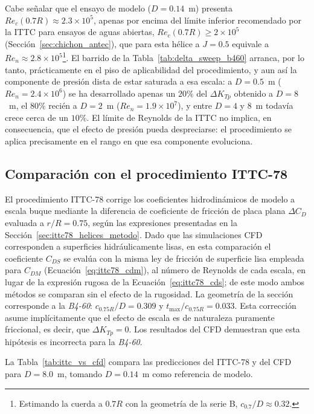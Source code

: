 Cabe señalar que el ensayo de modelo ($D=0.14$~m) presenta $Re_c(0.7R)\approx2.3\times10^5$, apenas por encima del límite inferior recomendado por la ITTC para ensayos de aguas abiertas, $Re_c(0.7R)\geq2\times10^5$ (Sección~\ref{sec:chichon_antec}), que para esta hélice a $J=0.5$ equivale a $Re_n\approx2.8\times10^5$\footnote{Estimando la cuerda a $0.7R$ con la geometría de la serie B, $c_{0.7}/D\approx0.32$.}. El barrido de la Tabla~\ref{tab:delta_sweep_b460} arranca, por lo tanto, prácticamente en el piso de aplicabilidad del procedimiento, y aun así la componente de presión dista de estar saturada a esa escala: a $D=0.5$~m ($Re_n=2.4\times10^6$) se ha desarrollado apenas un $20\%$ del $\Delta K_{Tp}$ obtenido a $D=8$~m, el $80\%$ recién a $D=2$~m ($Re_n=1.9\times10^7$), y entre $D=4$ y $8$~m todavía crece cerca de un $10\%$. El límite de Reynolds de la ITTC no implica, en consecuencia, que el efecto de presión pueda despreciarse: el procedimiento se aplica precisamente en el rango en que esa componente evoluciona.

\subsection{Comparación con el procedimiento ITTC-78}
\label{sec:helices_ittc78}

El procedimiento ITTC-78 corrige los coeficientes hidrodinámicos de modelo a escala buque mediante la diferencia de coeficiente de fricción de placa plana $\Delta C_D$ evaluada a $r/R = 0.75$, según las expresiones presentadas en la Sección~\ref{sec:ittc78_helices_metodo}. Dado que las simulaciones CFD corresponden a superficies hidráulicamente lisas, en esta comparación el coeficiente $C_{DS}$ se evalúa con la misma ley de fricción de superficie lisa empleada para $C_{DM}$ (Ecuación~\ref{eq:ittc78_cdm}), al número de Reynolds de cada escala, en lugar de la expresión rugosa de la Ecuación~\ref{eq:ittc78_cds}; de este modo ambos métodos se comparan sin el efecto de la rugosidad. La geometría de la sección corresponde a la \textit{B4-60}: $c_{0.75R}/D=0.309$ y $t_{\max}/c_{0.75R}=0.033$. Esta corrección asume implícitamente que el efecto de escala es de naturaleza puramente friccional, es decir, que $\Delta K_{Tp} = 0$. Los resultados del CFD demuestran que esta hipótesis es incorrecta para la \textit{B4-60}.

La Tabla~\ref{tab:ittc_vs_cfd} compara las predicciones del ITTC-78 y del CFD para $D = 8.0$~m, tomando $D = 0.14$~m como referencia de modelo.

